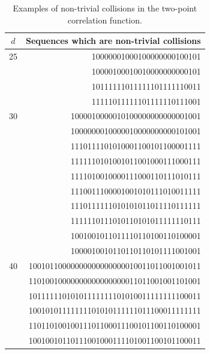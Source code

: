 \documentclass[12pt, a4paper]{article}
\begin{document}
\begin{table}[!pt]
  \centering
  \begin{tabular}{|c|r|}
    \hline
    $d$ & Sequences which are non-trivial collisions \\
    \hline
    25 & 10000001000100000000100101 \\
    & 10000100010010000000000101 \\
    \hline
    & 10111111011111101111110011 \\
    & 11111011111101111110111001 \\
    \hline
    30 & 1000010000010100000000000001001 \\
    & 1000000010000010000000000101001 \\
    \hline
    & 1110111101010001100101100001111 \\
    & 1111110101001011001000111000111 \\
    & 1111010010000111000110111010111 \\
    & 1110011100001001010111010011111 \\
    \hline
    & 1110111111010101011011110111111 \\
    & 1111110111010110101011111110111 \\
    \hline
    & 1001001011011110110100110100001 \\
    & 1000010010110110110101111001001 \\
    \hline
    40 & 10010110000000000000000010011011001001011 \\
    & 11010010000000000000000011011001001101001 \\
    \hline
    & 10111111010101111111101010011111111100011 \\
    & 10010101111111101010111111011100011111111 \\
    \hline
    & 11011010010011101100011100101100110100001 \\
    & 10010010110111001000111101001100101100011 \\
    \hline
  \end{tabular}
  \caption{Examples of non-trivial collisions in the two-point correlation
    function.}
  \label{tab:collisions}
\end{table}
\end{document}

